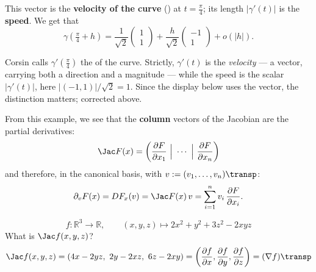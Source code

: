 \begin{center}
\end{center}

This vector is the \textbf{velocity of the curve} () at
$t = \tfrac{\pi}{4}$; its length $|\gamma'(t)|$ is the \textbf{speed}. We get that
\[\gamma\!\left(\tfrac{\pi}{4}+h\right) = \frac{1}{\sqrt{2}}\begin{pmatrix}1\\1\end{pmatrix} + \frac{h}{\sqrt{2}}\begin{pmatrix}-1\\1\end{pmatrix} + o(|h|).\]

\begin{ainote}
Corsin calls $\gamma'(\tfrac{\pi}{4})$ the  of the curve. Strictly, $\gamma'(t)$ is the
\emph{velocity} --- a vector, carrying both a direction and a magnitude --- while the speed is
the scalar $|\gamma'(t)|$, here $|(-1,1)|/\sqrt2 = 1$. Since the display below uses the vector,
the distinction matters; corrected above.
\end{ainote}

From this example, we see that the \textbf{column} vectors of the Jacobian are the partial
derivatives:
\[\Jac F(x) = \left(\frac{\partial F}{\partial x_1}\ \Big|\ \cdots\ \Big|\ \frac{\partial F}{\partial x_n}\right)\]
and therefore, in the canonical basis, with $v := (v_1,\dots,v_n)\transp$:
\[\partial_v F(x) = DF_x(v) = \Jac F(x)\,v = \sum_{i=1}^{n} v_i\,\frac{\partial F}{\partial x_i}.\]

\begin{example}
\[f : \mathbb{R}^3\to\mathbb{R}, \qquad (x,y,z) \mapsto 2x^2 + y^2 + 3z^2 - 2xyz\]
What is $\Jac f(x,y,z)$?
\[\Jac f(x,y,z) = (4x - 2yz,\ 2y - 2xz,\ 6z - 2xy) = \left(\frac{\partial f}{\partial x}, \frac{\partial f}{\partial y}, \frac{\partial f}{\partial z}\right) = (\nabla f)\transp\]
\end{example}

